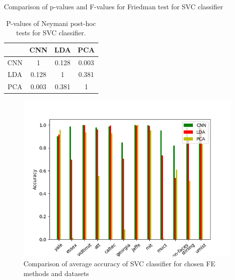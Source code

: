 \documentclass[a4paper, 10 pt, journal]{ieeeconf}
\begin{document}
\begin{table}[!h]
    \centering
    \caption{Comparison of p-values and F-values for Friedman test for SVC classifier}
    
    \label{table:svm_pvalues}
\end{table}

\begin{table}[!h]
    \centering
    \caption{P-values of Neymani post-hoc tests for SVC classifier.}
    \begin{tabular}{|c|c|c|c|}
         \hline
          & CNN & LDA & PCA \\
         \hline
         CNN &  1 &  0.128 &  0.003 \\
         \hline
         LDA &  0.128 & 1 &  0.381 \\
         \hline
         PCA &  0.003 & 0.381 & 1 \\
         \hline
    \end{tabular}
    \label{tab:svm_posthoc_pvalues}
\end{table}

\begin{figure}[!h]
    \centering
    \includegraphics[scale=0.875]{images/Svm_accuracy_comparison.png}
    \caption{Comparison of average accuracy of SVC classifier for chosen FE methods and datasets}
    \label{fig:svm_acc_comparision}
\end{figure}
\end{document}
